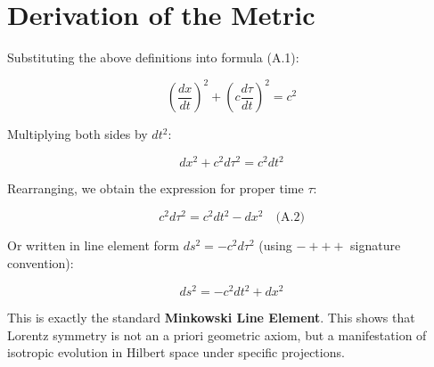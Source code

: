 \section{Derivation of the Metric}

Substituting the above definitions into formula (A.1):

$$(\frac{dx}{dt})^2 + (c \frac{d\tau}{dt})^2 = c^2$$

Multiplying both sides by $dt^2$:

$$dx^2 + c^2 d\tau^2 = c^2 dt^2$$

Rearranging, we obtain the expression for proper time $\tau$:

$$c^2 d\tau^2 = c^2 dt^2 - dx^2 \quad \text{(A.2)}$$

Or written in line element form $ds^2 = -c^2 d\tau^2$ (using $-+++$ signature convention):

$$ds^2 = -c^2 dt^2 + dx^2$$

This is exactly the standard \textbf{Minkowski Line Element}. This shows that Lorentz symmetry is not an a priori geometric axiom, but a manifestation of isotropic evolution in Hilbert space under specific projections.

